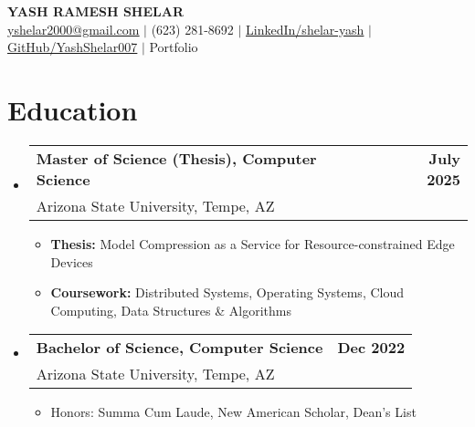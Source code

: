 \documentclass[a4paper, 10pt]{article}
\makeatletter
\newcommand{\resumeEducationContent}[4]{
  \item
    \begin{tabular*}{\textwidth}[t]{l@{\extracolsep{\fill}}r}
      \textbf{#1} & \textbf{#2} \\ 
      {#3} & {#4} \\
    \end{tabular*}
}
\makeatother
\begin{document}
\justifying
\begin{center}
    \textbf{\Large \scshape YASH RAMESH SHELAR} \\
    \href{mailto:yshelar2000@gmail.com}{\underline{yshelar2000@gmail.com}} $|$ 
    (623) 281-8692 $|$
    \href{https://linkedin.com/in/shelar-yash}{\underline{LinkedIn/shelar-yash}} $|$
    \href{https://github.com/YashShelar007}{\underline{GitHub/YashShelar007}} $|$
    Portfolio
\end{center}

\vspace{-10pt}
\section{Education}
\vspace{-5pt}
\begin{itemize}[itemsep=1pt, leftmargin=0in, label={}]
  \resumeEducationContent
    {Master of Science (Thesis), Computer Science}{July 2025}
    {Arizona State University, Tempe, AZ}{}
    \vspace{-8pt}
    \begin{itemize}[itemsep=-2pt]
      \item \textbf{Thesis:} Model Compression as a Service for Resource-constrained Edge Devices
      \item \textbf{Coursework:} Distributed Systems, Operating Systems, Cloud Computing, Data Structures \& Algorithms
    \end{itemize}
  \resumeEducationContent
    {Bachelor of Science, Computer Science}{Dec 2022}
    {Arizona State University, Tempe, AZ}{}
    \vspace{-8pt}
    \begin{itemize}[itemsep=-2pt]
      \item Honors: Summa Cum Laude, New American Scholar, Dean’s List
    \end{itemize}
\end{itemize}

\vspace{-10pt}
\end{document}
